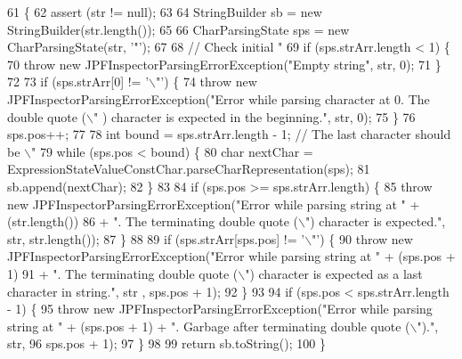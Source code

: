 \begin{DoxyCode}
61                                                                                              \{
62     assert (str != null);
63 
64     StringBuilder sb = \textcolor{keyword}{new} StringBuilder(str.length());
65 
66     CharParsingState sps = \textcolor{keyword}{new} CharParsingState(str, \textcolor{charliteral}{'"'});
67 
68     \textcolor{comment}{// Check initial "}
69     \textcolor{keywordflow}{if} (sps.strArr.length < 1) \{
70       \textcolor{keywordflow}{throw} \textcolor{keyword}{new} JPFInspectorParsingErrorException(\textcolor{stringliteral}{"Empty string"}, str, 0);
71     \}
72 
73     \textcolor{keywordflow}{if} (sps.strArr[0] != \textcolor{charliteral}{'\(\backslash\)"'}) \{
74       \textcolor{keywordflow}{throw} \textcolor{keyword}{new} JPFInspectorParsingErrorException(\textcolor{stringliteral}{"Error while parsing character at 0. The double quote (\(\backslash\)"
      ) character is expected in the beginning."}, str, 0);
75     \}
76     sps.pos++;
77 
78     \textcolor{keywordtype}{int} bound = sps.strArr.length - 1; \textcolor{comment}{// The last character should be \(\backslash\)"}
79     \textcolor{keywordflow}{while} (sps.pos < bound) \{
80       \textcolor{keywordtype}{char} nextChar = ExpressionStateValueConstChar.parseCharRepresentation(sps);
81       sb.append(nextChar);
82     \}
83 
84     \textcolor{keywordflow}{if} (sps.pos >= sps.strArr.length) \{
85       \textcolor{keywordflow}{throw} \textcolor{keyword}{new} JPFInspectorParsingErrorException(\textcolor{stringliteral}{"Error while parsing string at "} + (str.length())
86           + \textcolor{stringliteral}{". The terminating double quote (\(\backslash\)") character is expected."}, str, str.length());
87     \}
88 
89     \textcolor{keywordflow}{if} (sps.strArr[sps.pos] != \textcolor{charliteral}{'\(\backslash\)"'}) \{
90       \textcolor{keywordflow}{throw} \textcolor{keyword}{new} JPFInspectorParsingErrorException(\textcolor{stringliteral}{"Error while parsing string at "} + (sps.pos + 1)
91           + \textcolor{stringliteral}{". The terminating double quote (\(\backslash\)") character is expected as a last character in string."}, str
      , sps.pos + 1);
92     \}
93 
94     \textcolor{keywordflow}{if} (sps.pos < sps.strArr.length - 1) \{
95       \textcolor{keywordflow}{throw} \textcolor{keyword}{new} JPFInspectorParsingErrorException(\textcolor{stringliteral}{"Error while parsing string at "} + (sps.pos + 1) + \textcolor{stringliteral}{".
       Garbage after terminating double quote (\(\backslash\)")."}, str,
96           sps.pos + 1);
97     \}
98 
99     \textcolor{keywordflow}{return} sb.toString();
100   \}
\end{DoxyCode}

